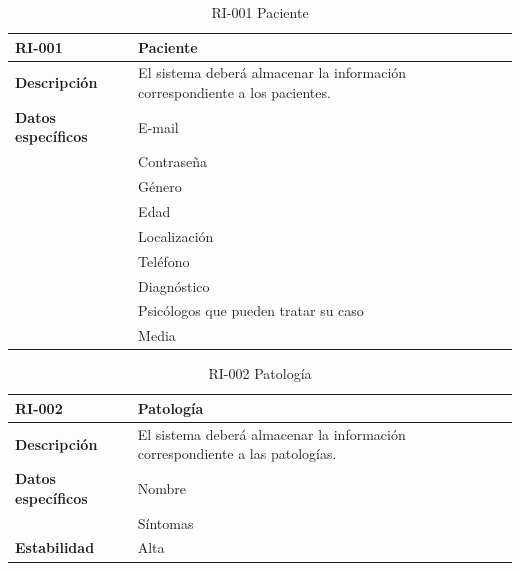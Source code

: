 \begin{table}[htpb]
\centering
\begin{tabularx}{\textwidth}{|l|X|}
\hline
\rowcolor[gray]{0.9}\textbf{RI-001}            & \textbf{Paciente}                                                                       \\ \hline
\textbf{Descripción}       & El sistema deberá almacenar la información correspondiente a los pacientes.    \\ \hline
\textbf{Datos específicos} & E-mail                                                                         \\ 
\multirow{8}{*}{} & Contraseña                                                                     \\ 
                  & Género                                                                         \\ 
                  & Edad                                                                           \\ 
                  & Localización                                                                   \\ 
                  & Teléfono                                                                       \\  
                  & Diagnóstico                                                                    \\  
                  & Psicólogos que pueden tratar su caso \\ \hline
\textbf{Estabilidad}       & Media                                                                          \\ \hline
\end{tabularx}
\caption{RI-001 Paciente}
\end{table}


\begin{table}[htpb]
\centering
\begin{tabularx}{\textwidth}{|l|X|}
\hline
\rowcolor[gray]{0.9}\textbf{RI-002}            & \textbf{Patología                                                                   } \\ \hline
\textbf{Descripción}       & El sistema deberá almacenar la información correspondiente a las patologías. \\ \hline
\textbf{Datos específicos} & Nombre                                                                       \\ 
                  & Síntomas                                                                     \\ \hline
\textbf{Estabilidad}       & Alta                                                                         \\ \hline
\end{tabularx}
\caption{RI-002 Patología}
\end{table}


